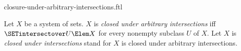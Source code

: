 \documentclass{stex}
\begin{document}
\begin{smodule}{closure-under-arbitrary-intersections.ftl}

\begin{definition}[forthel,for={closed under arbitrary intersections,closed under intersections}]
  Let $X$ be a system of sets.
  $X$ is \emph{closed under arbitrary intersections} iff $\SETintersectover U \Elem X$ for every nonempty subclass $U$ of $X$.
  Let $X$ is \emph{closed under intersections} stand for $X$ is closed under arbitrary intersections.
\end{definition}
\end{smodule}
\end{document}
